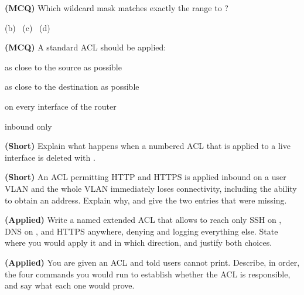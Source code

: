 \begin{reviewq}
  \item \textbf{(MCQ)} Which wildcard mask matches exactly the range
         to ?
        \begin{tight}
          \item[(a)]  \quad (b)~
          \quad (c)~ \quad (d)~
        \end{tight}
  \item \textbf{(MCQ)} A standard ACL should be applied:
        \begin{tight}
          \item[(a)] as close to the source as possible
          \item[(b)] as close to the destination as possible
          \item[(c)] on every interface of the router
          \item[(d)] inbound only
        \end{tight}
  \item \textbf{(Short)} Explain what happens when a numbered ACL that is applied
        to a live interface is deleted with .
  \item \textbf{(Short)} An ACL permitting HTTP and HTTPS is applied inbound on a
        user VLAN and the whole VLAN immediately loses connectivity, including
        the ability to obtain an address. Explain why, and give the two entries
        that were missing.
  \item \textbf{(Applied)} Write a named extended ACL that allows
         to reach only SSH on , DNS on
        , and HTTPS anywhere, denying and logging everything
        else. State where you would apply it and in which direction, and justify
        both choices.
  \item \textbf{(Applied)} You are given an ACL and told users cannot print.
        Describe, in order, the four commands you would run to establish whether
        the ACL is responsible, and say what each one would prove.
\end{reviewq}
